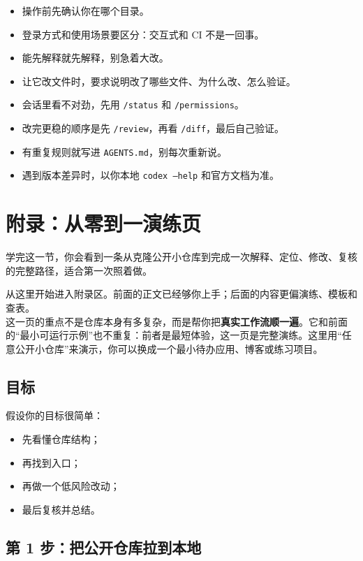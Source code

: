 \documentclass[UTF8,a4paper,12pt]{ctexart}
\begin{document}
\begin{itemize}
  \item 操作前先确认你在哪个目录。
  \item 登录方式和使用场景要区分：交互式和 CI 不是一回事。
  \item 能先解释就先解释，别急着大改。
  \item 让它改文件时，要求说明改了哪些文件、为什么改、怎么验证。
  \item 会话里看不对劲，先用 \texttt{/status} 和 \texttt{/permissions}。
  \item 改完更稳的顺序是先 \texttt{/review}，再看 \texttt{/diff}，最后自己验证。
  \item 有重复规则就写进 \texttt{AGENTS.md}，别每次重新说。
  \item 遇到版本差异时，以你本地 \texttt{codex --help} 和官方文档为准。
\end{itemize}

\section{附录：从零到一演练页}

\begin{learnbox}
学完这一节，你会看到一条从克隆公开小仓库到完成一次解释、定位、修改、复核的完整路径，适合第一次照着做。
\end{learnbox}

从这里开始进入附录区。前面的正文已经够你上手；后面的内容更偏演练、模板和查表。\\
这一页的重点不是仓库本身有多复杂，而是帮你把\textbf{真实工作流顺一遍}。它和前面的“最小可运行示例”也不重复：前者是最短体验，这一页是完整演练。这里用“任意公开小仓库”来演示，你可以换成一个最小待办应用、博客或练习项目。

\subsection{目标}

假设你的目标很简单：
\begin{itemize}
  \item 先看懂仓库结构；
  \item 再找到入口；
  \item 再做一个低风险改动；
  \item 最后复核并总结。
\end{itemize}

\subsection{第 1 步：把公开仓库拉到本地}
\end{document}
